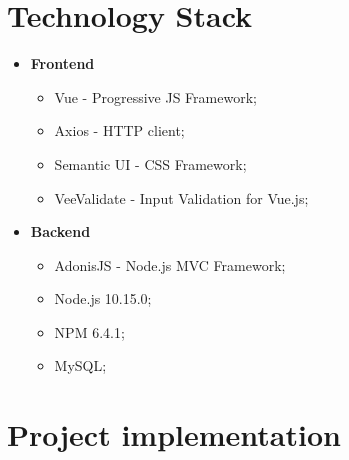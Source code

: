 \section{Technology Stack}
\begin{itemize}
	\item \textbf{Frontend} 
	\begin{itemize}
		\item Vue - Progressive JS Framework;
		\item Axios - HTTP client;
		\item Semantic UI - CSS Framework;
		\item VeeValidate - Input Validation for Vue.js;
	\end{itemize}
	
	\item \textbf{Backend}
	\begin{itemize}
		\item AdonisJS - Node.js MVC Framework; 
		\item Node.js 10.15.0;
		\item NPM 6.4.1;
		\item MySQL;
	\end{itemize}	
\end{itemize}

\section{Project implementation}


\clearpage